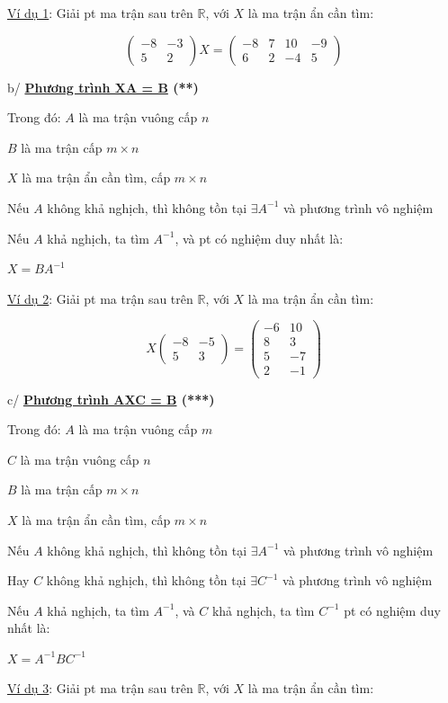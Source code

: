 \documentclass[
]{article}
\let\ul\uline
\begin{document}
\ul{Ví dụ 1}: Giải pt ma trận sau trên
$\mathbb{R}$, với
$X$ là ma trận ẩn
cần tìm:

$$\begin{pmatrix} -8 & -3 \\ 5 & 2 \end{pmatrix} X = \begin{pmatrix} -8 & 7 & 10 & -9 \\ 6 & 2 & -4 & 5 \end{pmatrix}$$

b/ \textbf{\ul{Phương trình XA = B} (**)}

Trong đó: $A$ là ma
trận vuông cấp $n$

$B$ là ma trận cấp
$m \times n$

$X$ là ma trận ẩn
cần tìm, cấp $m \times n$

Nếu $A$ không khả
nghịch, thì không tồn tại
$\exists A^{-1}$ và phương trình
vô nghiệm

Nếu $A$ khả nghịch,
ta tìm $A^{-1}$, và pt
có nghiệm duy nhất là:

$X = BA^{-1}$

\ul{Ví dụ 2}: Giải pt ma trận sau trên
$\mathbb{R}$, với
$X$ là ma trận ẩn
cần tìm:

$$X \begin{pmatrix} -8 & -5 \\ 5 & 3 \end{pmatrix} = \begin{pmatrix} -6 & 10 \\ 8 & 3 \\ 5 & -7 \\ 2 & -1 \end{pmatrix}$$

c/ \textbf{\ul{Phương trình AXC = B} (***)}

Trong đó: $A$ là ma
trận vuông cấp $m$

$C$ là ma trận
vuông cấp $n$

$B$ là ma trận cấp
$m \times n$

$X$ là ma trận ẩn
cần tìm, cấp $m \times n$

Nếu $A$ không khả
nghịch, thì không tồn tại
$\exists A^{-1}$ và phương trình
vô nghiệm

Hay $C$ không khả
nghịch, thì không tồn tại
$\exists C^{-1}$ và phương trình
vô nghiệm

Nếu $A$ khả nghịch,
ta tìm $A^{-1}$, và
$C$ khả nghịch, ta
tìm $C^{-1}$ pt có
nghiệm duy nhất là:

$X = A^{-1} B C^{-1}$

\ul{Ví dụ 3}: Giải pt ma trận sau trên
$\mathbb{R}$, với
$X$ là ma trận ẩn
cần tìm:
\end{document}
